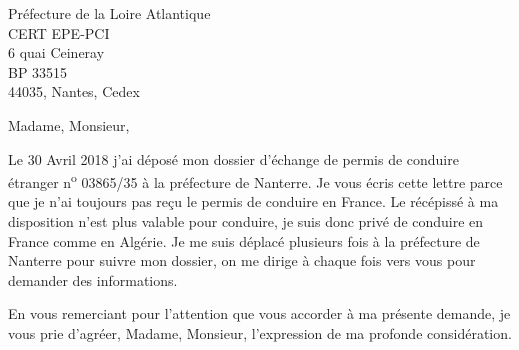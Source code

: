 \documentclass[12pt]{lettre}
\begin{document}
\begin{letter}{Préfecture de la Loire Atlantique \\
		CERT EPE-PCI\\
		6 quai Ceineray\\
		BP 33515\\
		44035, Nantes, Cedex
	}
	\signature{Aghiles DJOUDI}
	\address{Aghiles DJOUDI \\
		11, rue des sorrières, 92160, Antony}
	\nofax

	\def\concname{Objet :~}
	\opening{Madame, Monsieur,}

Le 30 Avril 2018 j'ai déposé mon dossier d'échange de permis de conduire étranger n\textsuperscript{o} 03865/35 à la préfecture de Nanterre.
Je vous écris cette lettre parce que je n'ai toujours pas reçu le permis de conduire en France.
Le récépissé à ma disposition n'est plus valable pour conduire, je suis donc privé de conduire en France comme en Algérie.
Je me suis déplacé plusieurs fois à la préfecture de Nanterre pour suivre mon dossier,
	on me dirige à chaque fois vers vous pour demander des informations.

\closing{En vous remerciant pour l'attention que vous accorder à ma présente demande,
	je vous prie d'agréer,
	Madame,
	Monsieur,
	l'expression de ma profonde considération.}

\end{letter}
\end{document}
